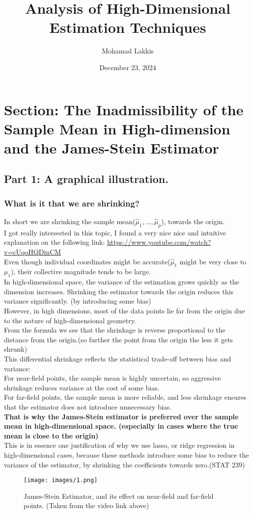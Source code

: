 \documentclass[12pt]{article}
\title{Analysis of High-Dimensional Estimation Techniques}
\author{Mohamad Lakkis}
\date{December 23, 2024}
\begin{document}
\maketitle

\section{Section: The Inadmissibility of the Sample Mean in High-dimension and the James-Stein Estimator}
\subsection{Part 1: A graphical illustration.}
\subsubsection*{What is it that we are shrinking?} 
In short we are shrinking the sample mean($\hat{\mu}_1, ...,\hat{\mu}_p$), towards the origin. \\
I got really intersested in this topic, I found a very nice nice and intuitive explanation on the following link: \url{https://www.youtube.com/watch?v=cUqoHQDinCM} \\
Even though individual coordinates might be accurate($\hat{\mu}_1$ might be very close to $\mu_1$), their collective magnitude tends to be large.\\
In high-dimensional space, the variance of the estimation grows quickly as the dimension increases. Shrinking the estimator towards the origin reduces this variance significantly. (by introducing some bias)\\
However, in high dimensions, most of the data points lie far from the origin due to the nature of high-dimensional geometry. \\
From the formula we see that the shrinkage is reverse proportional to the distance from the origin.(so further the point from the origin the less it gets shrunk) \\
This differential shrinkage reflects the statistical trade-off between bias and variance:
\\
    For near-field points, the sample mean is highly uncertain, so aggressive shrinkage reduces variance at the cost of some bias.\\
    For far-field points, the sample mean is more reliable, and less shrinkage ensures that the estimator does not introduce unnecessary bias.
    \\
    \textbf{That is why the James-Stein estimator is preferred over the sample mean in high-dimensional space. (especially in cases where the true mean is close to the origin)}\\
This is in essence one justification of why we use lasso, or ridge regression in high-dimensional cases, because these methods introduce some bias to reduce the variance of the estimator, by shrinking the coefficients towards zero.(STAT 239)
\begin{figure}[H]
  \centering 
  \texttt{[image: images/1.png]}
  \caption{James-Stein Estimator, and its effect on near-field and far-field points. (Taken from the video link above)}
\end{figure}
\end{document}
